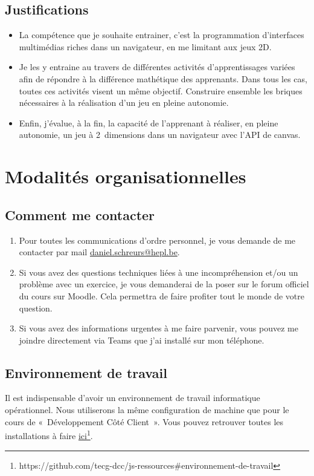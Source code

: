 \subsection{Justifications}
\begin{itemize}
    \item La compétence que je souhaite entrainer, c'est la programmation d'interfaces multimédias riches dans un navigateur, en me limitant aux jeux 2D.
    \item Je les y entraine au travers de différentes activités d'apprentissages variées afin de répondre à la différence mathétique des apprenants. Dans tous les cas, toutes ces activités visent un même objectif. Construire ensemble les briques nécessaires à la réalisation d'un jeu en pleine autonomie.
    \item Enfin, j'évalue, à la fin, la capacité de l'apprenant à réaliser, en pleine autonomie, un jeu à 2~dimensions dans un navigateur avec l'API de canvas.
\end{itemize}
\clearpage

\section{Modalités organisationnelles}
\subsection{Comment me contacter}
\begin{enumerate}
    \item Pour toutes les communications d'ordre personnel, je vous demande de me contacter par mail \href{mailto:daniel.schreurs@hepl.be}{daniel.schreurs@hepl.be}.
    \item Si vous avez des questions techniques liées à une incompréhension et/ou un problème avec un exercice, je vous demanderai de la poser sur le forum officiel du cours sur Moodle. Cela permettra de faire profiter tout le monde de votre question.
    \item Si vous avez des informations urgentes à me faire parvenir, vous pouvez me joindre directement via Teams que j'ai installé sur mon téléphone.
\end{enumerate}
\subsection{Environnement de travail}

Il est indispensable d'avoir un environnement de travail informatique opérationnel. Nous utiliserons la même configuration de machine que pour le cours de «~Développement Côté Client~». Vous pouvez retrouver toutes les installations à faire \href{https://github.com/tecg-dcc/js-ressources#environnement-de-travail}{ici}\footnote{https://github.com/tecg-dcc/js-ressources\#environnement-de-travail}.
\clearpage
\printbibliography


